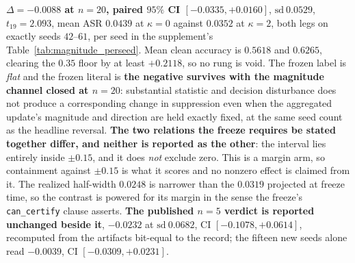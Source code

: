 \documentclass{article}
\begin{document}
\textbf{$\Delta = \mathbf{-0.0088}$ at $n{=}20$, paired $95\%$ CI $[-0.0335, +0.0160]$}, $\mathrm{sd}\ 0.0529$, $t_{19}{=}2.093$, mean ASR $0.0439$ at $\kappa{=}0$ against $0.0352$ at $\kappa{=}2$, both legs on exactly seeds $42$--$61$, per seed in the supplement's Table~\ref{tab:magnitude_perseed}. Mean clean accuracy is $0.5618$ and $0.6265$, clearing the $0.35$ floor by at least $+0.2118$, so no rung is void. The frozen label is \emph{flat} and the frozen literal is \textbf{the negative survives with the magnitude channel closed at $n{=}20$}: substantial statistic and decision disturbance does not produce a corresponding change in suppression even when the aggregated update's magnitude and direction are held exactly fixed, at the same seed count as the headline reversal. \textbf{The two relations the freeze requires be stated together differ, and neither is reported as the other}: the interval lies entirely inside $\pm0.15$, and it does \emph{not} exclude zero. This is a margin arm, so containment against $\pm0.15$ is what it scores and no nonzero effect is claimed from it. The realized half-width $0.0248$ is narrower than the $0.0319$ projected at freeze time, so the contrast is powered for its margin in the sense the freeze's \texttt{can\_certify} clause asserts. \textbf{The published $n{=}5$ verdict is reported unchanged beside it}, $-0.0232$ at $\mathrm{sd}\ 0.0682$, CI $[-0.1078,+0.0614]$, recomputed from the artifacts bit-equal to the record; the fifteen new seeds alone read $-0.0039$, CI $[-0.0309,+0.0231]$.
\end{document}
